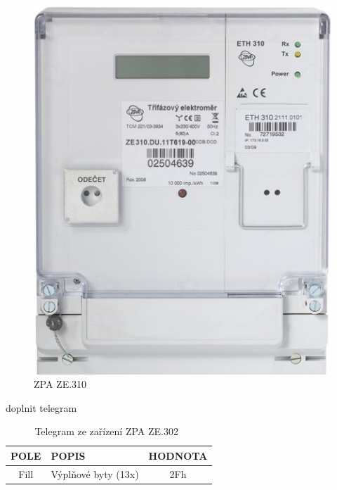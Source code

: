 	 \begin{figure}[!h]
  \begin{center}
    \includegraphics[scale=0.5]{obrazky/zarizeni_zpa}
  \end{center}
  \caption{ZPA ZE.310~\cite{CidloZpa}}
\end{figure}

\colorbox[rgb]{1,0,0}{doplnit telegram}

\begin{table}[!ht]
\centering
\caption{Telegram ze zařízení ZPA ZE.302~\cite{CidloZpa}}
\label{TabulkaTelegramKZPA}
\begin{tabular}{|c|l|c|}
\hline
\textbf{POLE}      & \textbf{POPIS}            & \textbf{HODNOTA} \\ \hline
Fill               & Výplňové byty (13x)                                 & 2Fh              \\ \hline

\end{tabular}%
\end{table}
	
	
	


